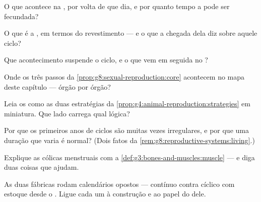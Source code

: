 \begin{exercise}[$\star$]\label{exo:g8:reproductive-systems:4}
O que acontece na , por volta de que dia, e por quanto tempo a
 pode ser fecundada?
\end{exercise}

\begin{exercise}[$\star$]\label{exo:g8:reproductive-systems:5}
O que é a , em termos do revestimento --- e o que a chegada
dela diz sobre aquele ciclo?
\end{exercise}

\begin{exercise}[$\star$]\label{exo:g8:reproductive-systems:6}
Que acontecimento suspende o ciclo, e o que vem em seguida no ?
\end{exercise}

\begin{exercise}[$\star\star$]\label{exo:g8:reproductive-systems:7}
Onde os três passos da \cref{prop:g8:sexual-reproduction:core}
acontecem no mapa deste capítulo --- órgão por órgão?
\end{exercise}

\begin{exercise}[$\star\star$]\label{exo:g8:reproductive-systems:8}
Leia os  como as duas estratégias da
\cref{prop:g4:animal-reproduction:strategies} em miniatura. Que lado
carrega qual lógica?
\end{exercise}

\begin{exercise}[$\star\star$]\label{exo:g8:reproductive-systems:9}
Por que os primeiros anos de ciclos são muitas vezes irregulares, e
por que uma duração que varia é normal? (Dois fatos da
\cref{rem:g8:reproductive-systems:living}.)
\end{exercise}

\begin{exercise}[$\star\star$]\label{exo:g8:reproductive-systems:10}
Explique as cólicas menstruais com a
\cref{def:g3:bones-and-muscles:muscle} --- e diga duas coisas que
ajudam.
\end{exercise}

\begin{exercise}[$\star\star$]\label{exo:g8:reproductive-systems:11}
As duas fábricas rodam calendários opostos --- contínuo contra cíclico
com estoque desde o . Ligue cada um à construção e ao papel
do  dele.
\end{exercise}


